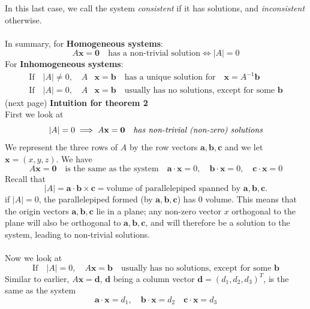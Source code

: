 \documentclass{report}
\begin{document}
In this last case, we call the system \textit{consistent} if it has solutions, 
and \textit{inconsistent} otherwise.\\
\vspace{1mm}\\
In summary, for \textbf{Homogeneous systems}:
\begin{equation*}
A\mathbf{x=0}\quad\text{has a non-trivial solution}\iff|A|=0
\end{equation*}
For \textbf{Inhomogeneous systems}:
\begin{align*}
\text{If}\quad|A|\neq0,\quad A&\mathbf{x=b}\quad\text{has a unique solution for}
\quad\mathbf{x}=A^{-1}\mathbf{b}\\
\text{If}\quad|A|=0,\quad A&\mathbf{x=b}\quad\text{usually has no solutions, 
except for some }\mathbf{b}
\end{align*}
(next page)
\newpage
\noindent\textbf{Intuition for theorem 2}\\
First we look at
\begin{equation*}
|A|=0\implies A\mathbf{x=0}\quad\text{\textit{has non-trivial (non-zero) solutions}}
\end{equation*}
We represent the three rows of $A$ by the row vectors $\mathbf{a,b,c}$ and we let 
$\mathbf{x}=(x,y,z)$. We have
\begin{equation*}
A\mathbf{x=0}\quad\text{is the same as the system}\quad
\mathbf{a\cdot x}=0,\quad\mathbf{b\cdot x}=0,\quad\mathbf{c\cdot x}=0
\end{equation*}
Recall that
\begin{equation*}
|A|=\mathbf{a\cdot b\times c}=\text{volume of parallelepiped spanned by $\mathbf{a,b,c}$.}
\end{equation*}
if $|A|=0$, the parallelepiped formed (by $\mathbf{a,b,c}$) has 0 volume. 
This means that the origin vectors $\mathbf{a,b,c}$ lie in a plane; any non-zero 
vector $x$ orthogonal to the plane will also be orthogonal to $\mathbf{a,b,c}$, 
and will therefore be a solution to the system, leading to non-trivial solutions.\\
\vspace{1mm}\\
Now we look at 
\begin{equation*}
\text{If}\quad|A|=0,\quad A\mathbf{x=b}\quad\text{usually has no solutions, 
except for some }\mathbf{b}
\end{equation*}
Similar to earlier, $A\mathbf{x=d}$, $\mathbf{d}$ being a column vector
$\mathbf{d}=(d_1,d_2,d_3)^T$, is the same as the system
\begin{equation*}
\mathbf{a\cdot x}=d_1,\quad\mathbf{b\cdot x}=d_2\quad\mathbf{c\cdot x}=d_3
\end{equation*}
\end{document}
